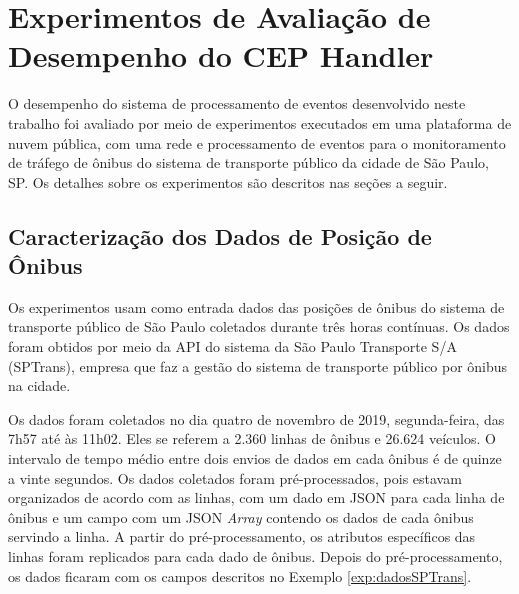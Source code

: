 \chapter{Experimentos de Avaliação de Desempenho do CEP Handler}
\label{cap:experimento}

O desempenho do sistema de processamento de eventos desenvolvido neste trabalho foi avaliado por meio de experimentos executados em uma plataforma de nuvem pública, com uma rede e processamento de eventos para o monitoramento de tráfego de ônibus do sistema de transporte público da cidade de São Paulo, SP. Os detalhes sobre os experimentos são descritos nas seções a seguir.

\section{Caracterização dos Dados de Posição de Ônibus}

Os experimentos usam como entrada dados das posições de ônibus do sistema de transporte público de São Paulo coletados durante três horas contínuas. Os dados foram obtidos por meio da API do sistema \cite{Olhovivo} da São Paulo Transporte S/A (SPTrans), empresa que faz a gestão do sistema de transporte público por ônibus na cidade.

Os dados foram coletados no dia quatro de novembro de 2019, segunda-feira, das 7h57 até às 11h02. Eles se referem a 2.360 linhas de ônibus e 26.624 veículos. O intervalo de tempo médio entre dois envios de dados em cada ônibus é de quinze a vinte segundos.
Os dados coletados foram pré-processados, pois estavam organizados de acordo com as linhas, com um dado em JSON para cada linha de ônibus e um campo com um JSON \textit{Array} contendo os dados de cada ônibus servindo a linha. A partir do pré-processamento, os atributos específicos das linhas foram replicados para cada dado de ônibus.
Depois do pré-processamento, os dados ficaram com os campos descritos no Exemplo \ref{exp:dadosSPTrans}.

